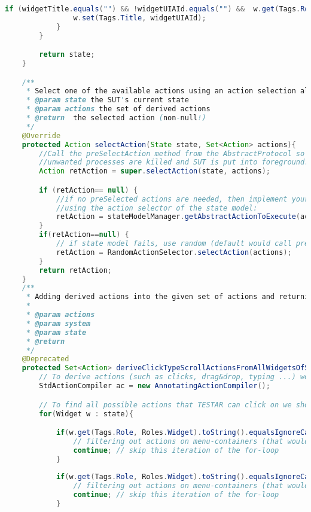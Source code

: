 \begin{lstlisting}[language=java, basicstyle=\tiny, caption=Protocol for the real world application, label=code:real-world-app-protocol]
            if (widgetTitle.equals("") && !widgetUIAId.equals("") &&  w.get(Tags.Role, Roles.Widget).equals(UIARoles.UIAButton)){
                w.set(Tags.Title, widgetUIAId);
            }
        }

        return state;
    }

    /**
     * Select one of the available actions using an action selection algorithm (for example random action selection)
     * @param state the SUT's current state
     * @param actions the set of derived actions
     * @return  the selected action (non-null!)
     */
    @Override
    protected Action selectAction(State state, Set<Action> actions){
        //Call the preSelectAction method from the AbstractProtocol so that, if necessary,
        //unwanted processes are killed and SUT is put into foreground.
        Action retAction = super.selectAction(state, actions);

        if (retAction== null) {
            //if no preSelected actions are needed, then implement your own action selection strategy
            //using the action selector of the state model:
            retAction = stateModelManager.getAbstractActionToExecute(actions);
        }
        if(retAction==null) {
            // if state model fails, use random (default would call preSelectAction() again, causing double actions HTML report):
            retAction = RandomActionSelector.selectAction(actions);
        }
        return retAction;
    }
    /**
     * Adding derived actions into the given set of actions and returning the modified set of actions.
     *
     * @param actions
     * @param system
     * @param state
     * @return
     */
    @Deprecated
    protected Set<Action> deriveClickTypeScrollActionsFromAllWidgetsOfState(Set<Action> actions, SUT system, State state){
        // To derive actions (such as clicks, drag&drop, typing ...) we should first create an action compiler.
        StdActionCompiler ac = new AnnotatingActionCompiler();

        // To find all possible actions that TESTAR can click on we should iterate through all widgets of the state.
        for(Widget w : state){

            if(w.get(Tags.Role, Roles.Widget).toString().equalsIgnoreCase("UIAMenu")){
                // filtering out actions on menu-containers (that would add an action in the middle of the menu)
                continue; // skip this iteration of the for-loop
            }
            
            if(w.get(Tags.Role, Roles.Widget).toString().equalsIgnoreCase("UIACustomControl")){
                // filtering out actions on menu-containers (that would add an action in the middle of the menu)
                continue; // skip this iteration of the for-loop
            }


\end{lstlisting}
